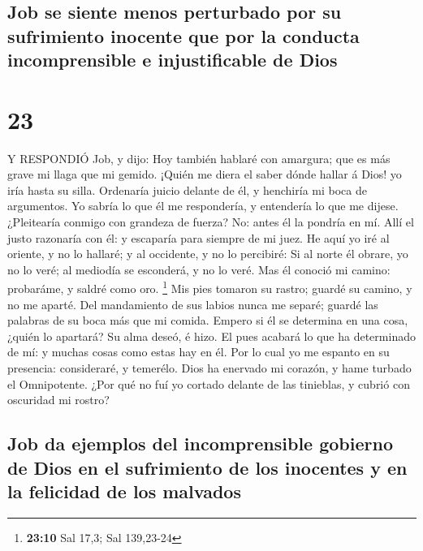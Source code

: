 \hypertarget{job-se-siente-menos-perturbado-por-su-sufrimiento-inocente-que-por-la-conducta-incomprensible-e-injustificable-de-dios}{%
\subsection{Job se siente menos perturbado por su sufrimiento inocente
que por la conducta incomprensible e injustificable de
Dios}\label{job-se-siente-menos-perturbado-por-su-sufrimiento-inocente-que-por-la-conducta-incomprensible-e-injustificable-de-dios}}

\hypertarget{section-22}{%
\section{23}\label{section-22}}

 Y RESPONDIÓ Job, y dijo:  Hoy también hablaré
con amargura; que es más grave mi llaga que mi gemido. 
¡Quién me diera el saber dónde hallar á Dios! yo iría hasta su silla.
 Ordenaría juicio delante de él, y henchiría mi boca de
argumentos.  Yo sabría lo que él me respondería, y
entendería lo que me dijese.  ¿Pleitearía conmigo con
grandeza de fuerza? No: antes él la pondría en mí.  Allí el
justo razonaría con él: y escaparía para siempre de mi juez.
 He aquí yo iré al oriente, y no lo hallaré; y al occidente,
y no lo percibiré:  Si al norte él obrare, yo no lo veré; al
mediodía se esconderá, y no lo veré.  Mas él conoció mi
camino: probaráme, y saldré como oro. \footnote{\textbf{23:10} Sal 17,3;
  Sal 139,23-24}  Mis pies tomaron su rastro; guardé su
camino, y no me aparté.  Del mandamiento de sus labios
nunca me separé; guardé las palabras de su boca más que mi comida.
 Empero si él se determina en una cosa, ¿quién lo apartará?
Su alma deseó, é hizo.  El pues acabará lo que ha
determinado de mí: y muchas cosas como estas hay en él. 
Por lo cual yo me espanto en su presencia: consideraré, y temerélo.
 Dios ha enervado mi corazón, y hame turbado el
Omnipotente.  ¿Por qué no fuí yo cortado delante de las
tinieblas, y cubrió con oscuridad mi rostro?

\hypertarget{job-da-ejemplos-del-incomprensible-gobierno-de-dios-en-el-sufrimiento-de-los-inocentes-y-en-la-felicidad-de-los-malvados}{%
\subsection{Job da ejemplos del incomprensible gobierno de Dios en el
sufrimiento de los inocentes y en la felicidad de los
malvados}\label{job-da-ejemplos-del-incomprensible-gobierno-de-dios-en-el-sufrimiento-de-los-inocentes-y-en-la-felicidad-de-los-malvados}}

